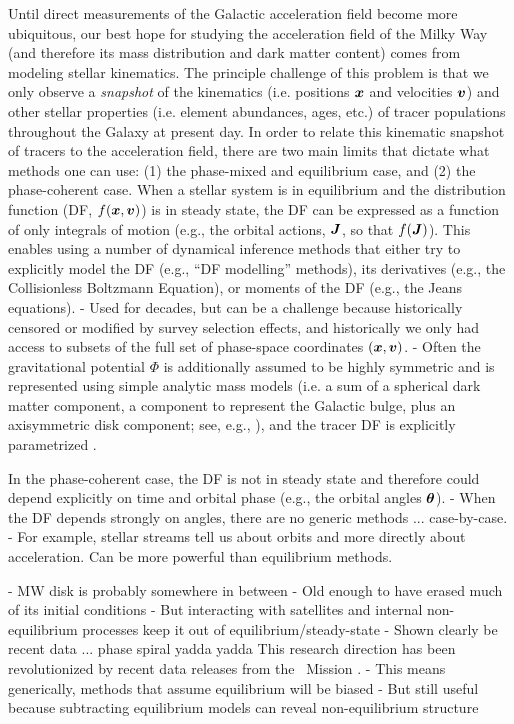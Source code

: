 Until direct measurements of the Galactic acceleration field become more ubiquitous, our
best hope for studying the acceleration field of the Milky Way (and therefore its mass
distribution and dark matter content) comes from modeling stellar kinematics.
The principle challenge of this problem is that we only observe a \emph{snapshot} of the
kinematics (i.e. positions $\boldsymbol{x}$ and velocities $\boldsymbol{v}$) and other stellar
properties (i.e. element abundances, ages, etc.) of tracer populations throughout the
Galaxy at present day.
In order to relate this kinematic snapshot of tracers to the acceleration field, there
are two main limits that dictate what methods one can use: (1) the phase-mixed and
equilibrium case, and (2) the phase-coherent case.
When a stellar system is in equilibrium and the distribution function (DF, $f(\boldsymbol{x},
\boldsymbol{v})$) is in steady state, the DF can be expressed as a function of only integrals of
motion (e.g., the orbital actions, $\boldsymbol{J}$, so that $f(\boldsymbol{J})$).
This enables using a number of dynamical inference methods that either try to explicitly
model the DF (e.g., ``DF modelling'' methods), its derivatives (e.g., the Collisionless
Boltzmann Equation), or moments of the DF (e.g., the Jeans equations).
- Used for decades, but can be a challenge because historically censored or modified by
survey selection effects, and historically we only had access to subsets of the full set
of phase-space coordinates $(\boldsymbol{x}, \boldsymbol{v})$.
- Often the gravitational potential $\Phi$ is additionally assumed to be highly
symmetric and is represented using simple analytic mass models (i.e. a sum of a
spherical dark matter component, a component to represent the Galactic bulge, plus an
axisymmetric disk component; see, e.g., \citealt{TODO}), and the tracer DF is explicitly
parametrized \citep[e.g.,][]{TODO}.

In the phase-coherent case, the DF is not in steady state and therefore could depend
explicitly on time and orbital phase (e.g., the orbital angles $\boldsymbol{\theta}$).
- When the DF depends strongly on angles, there are no generic methods ... case-by-case.
- For example, stellar streams tell us about orbits and more directly about acceleration. Can be more powerful than equilibrium methods.

- MW disk is probably somewhere in between
- Old enough to have erased much of its initial conditions
- But interacting with satellites and internal non-equilibrium processes keep it out of equilibrium/steady-state
- Shown clearly be recent data ... phase spiral yadda yadda
This research direction has been revolutionized by recent data releases from the \gaia\
Mission \citep{TODO}.
- This means generically, methods that assume equilibrium will be biased
- But still useful because subtracting equilibrium models can reveal non-equilibrium structure

